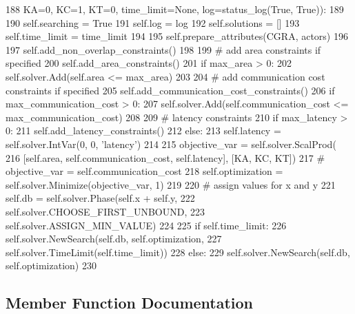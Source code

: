 \begin{DoxyCode}
188                  KA=0, KC=1, KT=0, time\_limit=\textcolor{keywordtype}{None}, log=status\_log(\textcolor{keyword}{True}, \textcolor{keyword}{True})):
189 
190         self.searching = \textcolor{keyword}{True}
191         self.log = log
192         self.solutions = []
193         self.time\_limit = time\_limit
194 
195         self.prepare\_attributes(CGRA, actors)
196 
197         self.add\_non\_overlap\_constraints()
198 
199         \textcolor{comment}{# add area constraints if specified}
200         self.add\_area\_constraints()
201         \textcolor{keywordflow}{if} max\_area > 0:
202             self.solver.Add(self.area <= max\_area)
203 
204         \textcolor{comment}{# add communication cost constraints if specified}
205         self.add\_communication\_cost\_constraints()
206         \textcolor{keywordflow}{if} max\_communication\_cost > 0:
207             self.solver.Add(self.communication\_cost <= max\_communication\_cost)
208 
209         \textcolor{comment}{# latency constraints}
210         \textcolor{keywordflow}{if} max\_latency > 0:
211             self.add\_latency\_constraints()
212         \textcolor{keywordflow}{else}:
213             self.latency = self.solver.IntVar(0, 0, \textcolor{stringliteral}{'latency'})
214 
215         objective\_var = self.solver.ScalProd(
216             [self.area, self.communication\_cost, self.latency], [KA, KC, KT])
217         \textcolor{comment}{# objective\_var = self.communication\_cost}
218         self.optimization = self.solver.Minimize(objective\_var, 1)
219 
220         \textcolor{comment}{# assign values for x and y}
221         self.db = self.solver.Phase(self.x + self.y,
222                                     self.solver.CHOOSE\_FIRST\_UNBOUND,
223                                     self.solver.ASSIGN\_MIN\_VALUE)
224 
225         \textcolor{keywordflow}{if} self.time\_limit:
226             self.solver.NewSearch(self.db, self.optimization,
227                                   self.solver.TimeLimit(self.time\_limit))
228         \textcolor{keywordflow}{else}:
229             self.solver.NewSearch(self.db, self.optimization)
230 
\end{DoxyCode}


\subsection{Member Function Documentation}
\mbox{\label{classsylva_1_1code__generation_1_1floorplanner_1_1floorplanner_a0be73170e12b6ac4ecb594d4dab14f0d}} 

